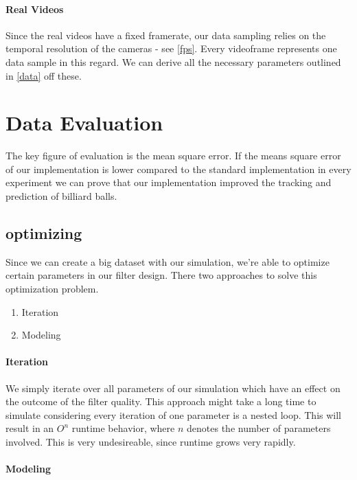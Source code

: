 \documentclass[titlepage, a4paper, 11pt]{scrartcl}
\begin{document}
\paragraph{Real Videos}

Since the real videos have a fixed framerate, our data sampling relies on the temporal resolution of the cameras - see \ref{fps}.
Every videoframe represents one data sample in this regard. We can derive all the necessary parameters outlined in \ref{data} off these.


\section{Data Evaluation}

The key figure of evaluation is the mean square error.
If the means square error of our implementation is lower compared to the standard implementation in every experiment we can prove that our implementation improved the tracking and prediction of billiard balls.

\subsection{optimizing}

Since we can create a big dataset with our simulation, we're able to optimize certain parameters in our filter design.
There two approaches to solve this optimization problem. 

\begin{enumerate}
    \item Iteration
    \item Modeling
\end{enumerate}

\paragraph{Iteration}

We simply iterate over all parameters of our simulation which have an effect on the outcome of the filter quality.
This approach might take a long time to simulate considering every iteration of one parameter is a nested loop.
This will result in an $O^{n}$ runtime behavior, where $n$ denotes the number of parameters involved. 
This is very undesireable, since runtime grows very rapidly.

\paragraph{Modeling}
\end{document}
